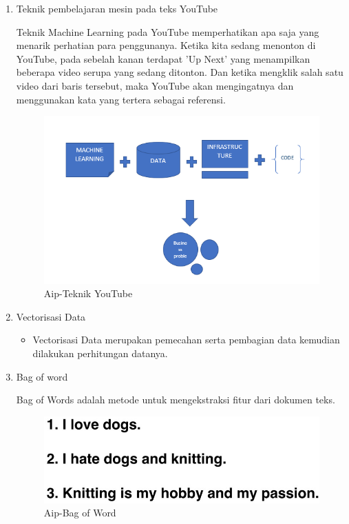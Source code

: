 \begin{enumerate}
\item Teknik pembelajaran mesin pada teks YouTube
	\par Teknik Machine Learning pada YouTube memperhatikan apa saja yang menarik perhatian para penggunanya. Ketika kita sedang menonton di YouTube, pada sebelah kanan terdapat 'Up Next' yang menampilkan beberapa video serupa yang sedang ditonton. Dan ketika mengklik salah satu video dari baris tersebut, maka YouTube akan mengingatnya dan menggunakan kata yang tertera sebagai referensi.
	\begin{figure}[ht]
		\centering
		\includegraphics[scale=0.5]{figures/AIP/b3.PNG}
		\caption{Aip-Teknik YouTube}
		\label{contoh}
	\end{figure}

\item Vectorisasi Data
	\begin{itemize}
		\item Vectorisasi Data merupakan pemecahan serta pembagian data kemudian dilakukan perhitungan datanya.
	\end{itemize}
	
\item Bag of word
	\par Bag of Words adalah metode untuk mengekstraksi fitur dari dokumen teks.
	\begin{figure}[ht]
		\centering
		\includegraphics[scale=0.5]{figures/AIP/b4.PNG}
		\caption{Aip-Bag of Word}
		\label{contoh}
	\end{figure}
	

\end{enumerate}
